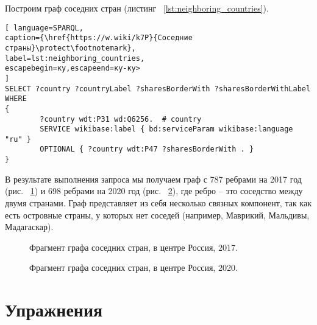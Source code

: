 Построим граф соседних стран (листинг ~\ref{lst:neighboring_countries}).

\begin{lstlisting}[ language=SPARQL, 
caption={\href{https://w.wiki/k7P}{Соседние страны}\protect\footnotemark},
label=lst:neighboring_countries, 
escapebegin=ку,escapeend=ку-ку>
]
SELECT ?country ?countryLabel ?sharesBorderWith ?sharesBorderWithLabel
WHERE
{
		?country wdt:P31 wd:Q6256.	# country
		SERVICE wikibase:label { bd:serviceParam wikibase:language "ru" }
		OPTIONAL { ?country wdt:P47 ?sharesBorderWith . }
}
\end{lstlisting}


В результате выполнения запроса мы получаем граф с 787 ребрами на 2017 год (рис. ~\ref{fig:neighboring_countries_2017}) и 698 ребрами на 2020 год (рис. ~\ref{fig:neighboring_countries_2020}), где ребро – это соседство между двумя странами. Граф представляет из себя несколько связных компонент, так как есть островные страны, у которых нет соседей (например, Маврикий, Мальдивы, Мадагаскар).

\begin{figure}
	{
		\setlength{\fboxsep}{0pt}%
		\setlength{\fboxrule}{1pt}%
	}
	\caption{Фрагмент графа соседних стран, в центре Россия, 2017.
	}%
	\label{fig:neighboring_countries_2017}%
\end{figure}

\begin{figure}
	{
		\setlength{\fboxsep}{0pt}%
		\setlength{\fboxrule}{1pt}%
	}
	\caption{Фрагмент графа соседних стран, в центре Россия, 2020.
	}%
	\label{fig:neighboring_countries_2020}%
\end{figure}


\section{Упражнения}

